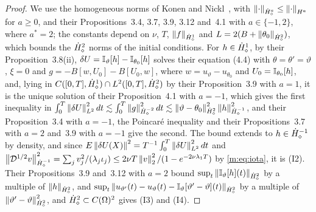 \begin{proof}
We use the homogeneous norms of Konen and Nickl~\cite{konennickl2026}, with $\left\|\cdot\right\|_{\dot H^{a}_\diamond}\le\left\|\cdot\right\|_{H^a}$ for $a\ge0$, and their Propositions~3.4, 3.7, 3.9, 3.12 and~4.1 with $a\in\{-1,2\}$, where $a^*=2$; the constants depend on $\nu$, $T$, $\left\|f\right\|_{\dot H^{1}_\diamond}$ and $L=2(B+\left\|\theta_0\right\|_{\dot H^{2}_\diamond})$, which bounds the $\dot H^{2}_\diamond$ norms of the initial conditions. For $h\in\dot H^{1}_\diamond$, by their Proposition~3.8(ii), $\delta U=\mathbb{I}_\vartheta[h]-\mathbb{I}_{\theta_0}[h]$ solves their equation (4.4) with $\theta=\theta'=\vartheta$, $\xi=0$ and $g=-B[w,U_0]-B[U_0,w]$, where $w=u_\vartheta-u_{\theta_0}$ and $U_0=\mathbb{I}_{\theta_0}[h]$, and, lying in $C([0,T],\dot H^{1}_\diamond)\cap L^2([0,T],\dot H^{2}_\diamond)$ by their Proposition~3.9 with $a=1$, it is the unique solution of their Proposition~4.1 with $a=-1$, which gives the first inequality in $\int_0^T\left\|\delta U\right\|^2_{L^2}dt\lesssim\int_0^T\left\|g\right\|^2_{\dot H^{-2}_\diamond}dt\lesssim\left\|\vartheta-\theta_0\right\|^2_{\dot H^{2}_\diamond}\left\|h\right\|^2_{\dot H^{-1}_\diamond}$, and their Proposition~3.4 with $a=-1$, the Poincar\'e inequality and their Propositions~3.7 with $a=2$ and~3.9 with $a=-1$ give the second. The bound extends to $h\in\dot H^{-1}_\diamond$ by density, and since $E\left\|\delta U(X)\right\|^2=T^{-1}\int_0^T\left\|\delta U\right\|^2_{L^2}dt$ and $\left\|\mathcal D^{1/2}v\right\|^2_{\dot H^{-1}_\diamond}=\sum_jv_j^2/(\lambda_j\iota_j)\le2\nu T\left\|v\right\|^2_2/(1-e^{-2\nu\lambda_1T})$ by \eqref{m:eq:iota}, it is (I2). Their Propositions~3.9 and~3.12 with $a=2$ bound $\sup_t\left\|\mathbb{I}_\vartheta[h](t)\right\|_{\dot H^{2}_\diamond}$ by a multiple of $\left\|h\right\|_{\dot H^{2}_\diamond}$, and $\sup_t\left\|u_{\vartheta'}(t)-u_\vartheta(t)-\mathbb{I}_\vartheta[\vartheta'-\vartheta](t)\right\|_{\dot H^{2}_\diamond}$ by a multiple of $\left\|\vartheta'-\vartheta\right\|^2_{\dot H^{2}_\diamond}$, and $\dot H^{2}_\diamond\subset C(\Omega)^2$ gives (I3) and (I4).
\end{proof}

